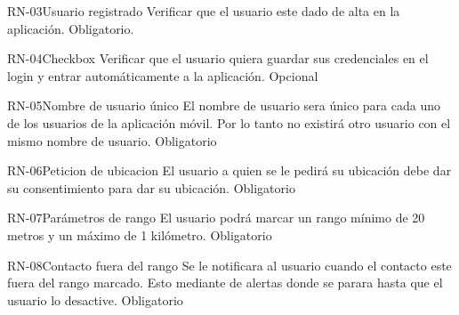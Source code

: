 \begin{BussinesRule}{RN-03}{Usuario registrado}
	\BRitem[Descripción:] Verificar que el usuario este dado de alta en la aplicación.
	\BRitem[Nivel:] Obligatorio.
\end{BussinesRule}

\begin{BussinesRule}{RN-04}{Checkbox}
	\BRitem[Descripción:] Verificar que el usuario quiera guardar sus credenciales en el login y entrar automáticamente a la aplicación.
	\BRitem[Nivel:] Opcional
\end{BussinesRule}

\begin{BussinesRule}{RN-05}{Nombre de usuario único}
	\BRitem[Descripción:] El nombre de usuario sera único para cada uno de los usuarios de la aplicación móvil. Por lo tanto no existirá otro usuario con el mismo nombre de usuario.
	\BRitem[Nivel:] Obligatorio
\end{BussinesRule}

\begin{BussinesRule}{RN-06}{Peticion de ubicacion}
	\BRitem[Descripción:] El usuario a quien se le pedirá su ubicación debe dar su consentimiento para dar su ubicación.
	\BRitem[Nivel:] Obligatorio
\end{BussinesRule}

\begin{BussinesRule}{RN-07}{Parámetros de rango}
	\BRitem[Descripción:] El usuario podrá marcar un rango mínimo de 20 metros y un máximo de 1 kilómetro.
	\BRitem[Nivel:] Obligatorio
\end{BussinesRule}

\begin{BussinesRule}{RN-08}{Contacto fuera del rango}
	\BRitem[Descripción:] Se le notificara al usuario cuando el contacto este fuera del rango marcado. Esto mediante de alertas donde se parara hasta que el usuario lo desactive.
	\BRitem[Nivel:] Obligatorio
\end{BussinesRule}

